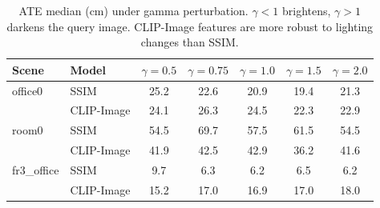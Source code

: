 \begin{table}[t]
\centering
\small
\setlength{\tabcolsep}{4pt}
\begin{tabular}{@{}llccccc@{}}
\toprule
\textbf{Scene} & \textbf{Model} & $\gamma=0.5$ & $\gamma=0.75$ & $\gamma=1.0$ & $\gamma=1.5$ & $\gamma=2.0$ \\
\midrule
  office0 & SSIM & 25.2 & 22.6 & 20.9 & 19.4 & 21.3 \\
   & CLIP-Image & 24.1 & 26.3 & 24.5 & 22.3 & 22.9 \\
\midrule
  room0 & SSIM & 54.5 & 69.7 & 57.5 & 61.5 & 54.5 \\
   & CLIP-Image & 41.9 & 42.5 & 42.9 & 36.2 & 41.6 \\
\midrule
  fr3_office & SSIM & 9.7 & 6.3 & 6.2 & 6.5 & 6.2 \\
   & CLIP-Image & 15.2 & 17.0 & 16.9 & 17.0 & 18.0 \\
\bottomrule
\end{tabular}
\caption{ATE median (cm) under gamma perturbation. $\gamma < 1$ brightens, $\gamma > 1$ darkens the query image. CLIP-Image features are more robust to lighting changes than SSIM.}
\label{tab:lighting_ablation}
\end{table}